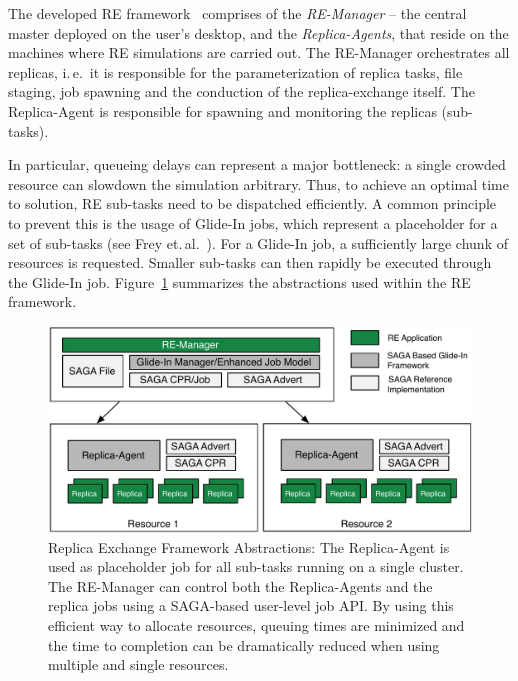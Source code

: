 \documentclass{llncs}
\begin{document}
The developed RE framework~\cite{Luckow:2008la} comprises of the
\emph{RE-Manager} -- the central master deployed on the user's
desktop, and the \textit{Replica-Agents}, that reside on the machines
where RE simulations are carried out. The RE-Manager orchestrates all
replicas, i.\,e.\ it is responsible for the parameterization of
replica tasks, file staging, job spawning and the conduction of the
replica-exchange itself.  The Replica-Agent %
is responsible for spawning and monitoring the replicas (sub-tasks).

In particular, queueing delays can represent a major bottleneck: a
single crowded resource can slowdown the simulation arbitrary. Thus,
to achieve an optimal time to solution, RE sub-tasks need to be
dispatched efficiently.  A common principle to prevent this is the
usage of Glide-In jobs, which represent a placeholder for a set of
sub-tasks (see Frey et.\,al.~\cite{citeulike:291860}).  For a Glide-In
job, a sufficiently large chunk of resources is requested. Smaller
sub-tasks can then rapidly be executed through the Glide-In job.
Figure~\ref{fig:remdmanager_v11} summarizes the abstractions used
within the RE framework.

\begin{figure}[htbp]
    \centering
        \includegraphics[width=4.5in]{remdmanager_v11.pdf}
        \caption{Replica Exchange Framework Abstractions: The
          Replica-Agent is used as placeholder job for all sub-tasks
          running on a single cluster. The RE-Manager can control both
          the Replica-Agents and the replica jobs using a SAGA-based
          user-level job API. By using this efficient way to allocate
          resources, queuing times are minimized and the time to
          completion can be dramatically reduced when using multiple
          and single resources. \up}
    \label{fig:remdmanager_v11}
\end{figure}  
\end{document}

